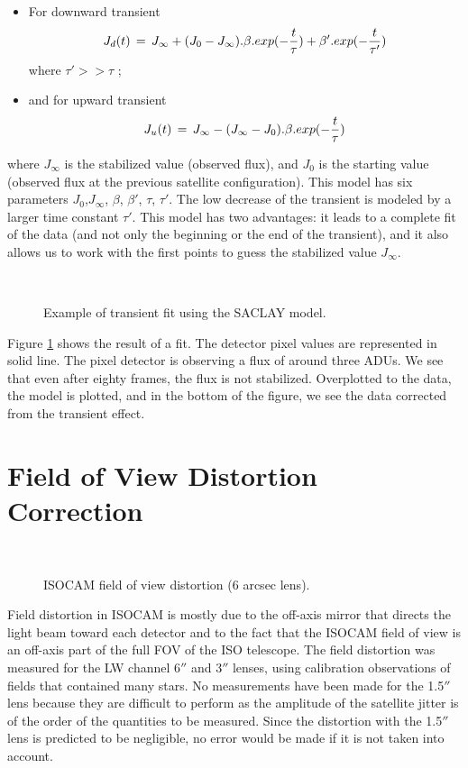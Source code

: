 \begin{itemize}
\item For downward transient
	\[ J_d(t)\,=\,J_{\infty} + (J_0 - J_{\infty}).\beta.exp(- {t \over \tau}) + \beta' . exp(- {t \over \tau'}) \] 
where $\tau' >> \tau$ ;

\item and for upward transient
	\[ J_u(t)\,=\, J_{\infty} - (J_{\infty} - J_0).\beta.exp(- {t \over \tau}) \]
\end{itemize}
where $J_{\infty}$ is the stabilized value (observed flux), and $J_0$ is
the starting value (observed flux at the previous satellite configuration). This model has six parameters $J_0$,$J_{\infty}$, $\beta$, $\beta'$, $\tau$, $\tau'$.
The low decrease of the transient is modeled by a larger time constant
$\tau'$.  This model has two advantages: it leads to a complete fit of
the data (and not only the beginning or the end of the transient), and
it also allows us to work with the first points to guess the
stabilized value $J_{\infty}$.


\begin{figure}[htb]
\centerline{
\hbox{
}}
\caption{Example of transient fit using the SACLAY model.}
\label{fig_trans_cea1}
\end{figure}

Figure \ref{fig_trans_cea1} shows the result of a fit. The detector pixel values  
  are represented in solid line. The pixel detector is observing
a flux of around three ADUs. We see that even after
eighty frames, the flux is not stabilized. Overplotted to the data, the 
model is plotted, and in the bottom of the figure, we see the data corrected
from the transient effect.
\clearpage

\section{Field of View Distortion Correction}

\begin{figure}[htb]
\centerline{
\hbox{
}}
\caption{ISOCAM field of view distortion (6 arcsec lens).}
\label{fig_disto}
\end{figure}

 Field distortion in ISOCAM is mostly due to the off-axis mirror
that directs the light beam toward each detector and to the fact that
the ISOCAM field of view is an off-axis part of the full FOV of the
ISO telescope.  The field distortion was measured for the LW channel
6$''$ and 3$''$ lenses, using calibration observations of fields that
contained many stars. No measurements have been made for the 1.5$''$ lens
because they are difficult to perform as the amplitude of the
satellite jitter is of the order of the quantities to be
measured. 
Since the distortion with the 1.5$''$ lens is predicted to be negligible, no
error would be made if it is not taken into account.

